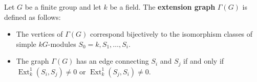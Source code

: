 \begin{definition}
\label{def:extension-graph}
Let $G$ be a finite group and let $k$ be a field. The \textbf{extension graph} $\Gamma(G)$ is defined as follows:
\begin{itemize}
\item The vertices of $\Gamma(G)$ correspond bijectively to the isomorphism classes of simple $kG$-modules $S_0 = k, S_1, \ldots, S_i$.
\item The graph $\Gamma(G)$ has an edge connecting $S_i$ and $S_j$ if and only if $\operatorname{Ext}_k^1(S_i, S_j) \neq 0$ or $\operatorname{Ext}_k^1(S_j, S_i) \neq 0$.
\end{itemize}
\end{definition}
